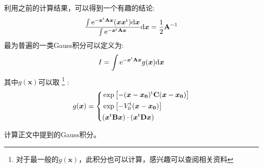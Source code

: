         利用之前的计算结果，可以得到一个有趣的结论:
        \begin{equation}
            \frac{\int\mathrm{e}^{-\bm{x}^{\mathrm{t}}\mathbf{A}\bm{x}}(\bm{x}\bm{x}^{\mathrm{t}})\mathrm{d} \bm{x}}{\int\mathrm{e}^{-\bm{x}^{\mathrm{t}}\mathbf{A}\bm{x}}}\mathrm{d} \bm{x}
            = \frac{1}{2}\mathbf{A}^{-1}
        \end{equation}
        最为普遍的一类Gauss积分可以定义为:
        \begin{equation}
            I = \int\mathrm{e}^{-\bm{x}^{\mathrm{t}}\mathbf{A}\bm{x}}g(\bm{x})\mathrm{d} \bm{x}
        \end{equation}
        其中$g(\bm{x})$可以取
        \footnote{对于最一般的$g(\bm{x})$，此积分也可以计算，感兴趣可以查阅相关资料}
        :
        \begin{equation}
            g(\bm{x}) = 
            \left\{
            \begin{split}
                    &\exp\left[-(\bm{x} - \bm{x_0})^{\mathrm{t}}\mathbf{C}(\bm{x} - \bm{x_0})\right]\\
                    &\exp\left[-V_0^{\mathrm{t}}(\bm{x} - \bm{x_0})\right]\\
                    &(\bm{x}^{\mathrm{t}}\mathbf{B}\bm{x})\cdot(\bm{x}^{\mathrm{t}}\mathbf{D}\bm{x})
            \end{split}
            \right.
        \end{equation}
        \begin{asg}
            计算正文中提到的Gauss积分。
        \end{asg}

        
        
        